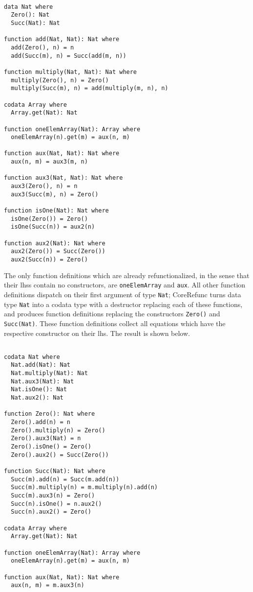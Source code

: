 \begin{lstlisting}

data Nat where
  Zero(): Nat
  Succ(Nat): Nat

function add(Nat, Nat): Nat where
  add(Zero(), n) = n
  add(Succ(m), n) = Succ(add(m, n))

function multiply(Nat, Nat): Nat where
  multiply(Zero(), n) = Zero()
  multiply(Succ(m), n) = add(multiply(m, n), n)

codata Array where
  Array.get(Nat): Nat

function oneElemArray(Nat): Array where
  oneElemArray(n).get(m) = aux(n, m)

function aux(Nat, Nat): Nat where
  aux(n, m) = aux3(m, n)

function aux3(Nat, Nat): Nat where
  aux3(Zero(), n) = n
  aux3(Succ(m), n) = Zero()

function isOne(Nat): Nat where
  isOne(Zero()) = Zero()
  isOne(Succ(n)) = aux2(n)

function aux2(Nat): Nat where
  aux2(Zero()) = Succ(Zero())
  aux2(Succ(n)) = Zero()

\end{lstlisting}

The only function definitions which are already refunctionalized, in the sense that their lhss contain no constructors, are \texttt{oneElemArray} and \texttt{aux}. All other function definitions dispatch on their first argument of type \texttt{Nat}; \textsf{CoreRefunc} turns data type \texttt{Nat} into a codata type with a destructor replacing each of these functions, and produces function definitions replacing the constructors \texttt{Zero()} and \texttt{Succ(Nat)}. These function definitions collect all equations which have the respective constructor on their lhs. The result is shown below.

\begin{lstlisting}

codata Nat where
  Nat.add(Nat): Nat
  Nat.multiply(Nat): Nat
  Nat.aux3(Nat): Nat
  Nat.isOne(): Nat
  Nat.aux2(): Nat

function Zero(): Nat where
  Zero().add(n) = n
  Zero().multiply(n) = Zero()
  Zero().aux3(Nat) = n
  Zero().isOne() = Zero()
  Zero().aux2() = Succ(Zero())

function Succ(Nat): Nat where
  Succ(m).add(n) = Succ(m.add(n))
  Succ(m).multiply(n) = m.multiply(n).add(n)
  Succ(m).aux3(n) = Zero()
  Succ(n).isOne() = n.aux2()
  Succ(n).aux2() = Zero()

codata Array where
  Array.get(Nat): Nat

function oneElemArray(Nat): Array where
  oneElemArray(n).get(m) = aux(n, m)

function aux(Nat, Nat): Nat where
  aux(n, m) = m.aux3(n)

\end{lstlisting}

